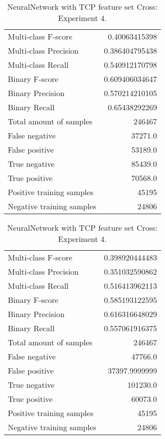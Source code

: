 \begin{table}[H]
\begin{minipage}{0.5\textwidth}
\caption{NeuralNetwork with TCP feature set Cross: \\Experiment 3.}
\centering
\begin{tabular}{l r}
\toprule
Multi-class F-score & 0.40063415398 \\
Multi-class Precision & 0.386404795438 \\
Multi-class Recall & 0.540912170798 \\
\midrule
Binary F-score & 0.609406034647 \\
Binary Precision & 0.570214210105 \\
Binary Recall & 0.65438292269 \\
\midrule
Total amount of samples & 246467 \\
False negative & 37271.0 \\
False positive & 53189.0 \\
True negative & 85439.0 \\
True positive & 70568.0 \\
\midrule
Positive training samples & 45195 \\
Negative training samples & 24806 \\
\bottomrule
\end{tabular}
\end{minipage}
\hfillx
\begin{minipage}{0.5\textwidth}
\caption{NeuralNetwork with TCP feature set Cross: \\Experiment 4.}
\centering
\begin{tabular}{l r}
\toprule
Multi-class F-score & 0.398920444483 \\
Multi-class Precision & 0.351032590862 \\
Multi-class Recall & 0.516413962113 \\
\midrule
Binary F-score & 0.585193122595 \\
Binary Precision & 0.616316648029 \\
Binary Recall & 0.557061916375 \\
\midrule
Total amount of samples & 246467 \\
False negative & 47766.0 \\
False positive & 37397.9999999 \\
True negative & 101230.0 \\
True positive & 60073.0 \\
\midrule
Positive training samples & 45195 \\
Negative training samples & 24806 \\
\bottomrule
\end{tabular}
\end{minipage}
\end{table}
